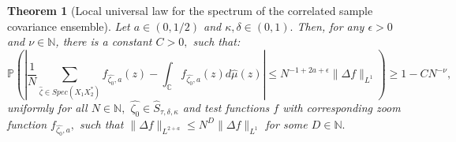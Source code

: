 \documentclass[10pt,a4paper]{amsart}
\newtheorem{thm}{Theorem}
\begin{document}
\begin{thm}[Local universal law for the spectrum of the correlated sample covariance ensemble] \label{main'}
%
Let $a\in (0,1/2)$ and $\kappa,\delta \in (0,1).$ Then, for any $\epsilon>0$ and $\nu \in \mathbb{N}$, there is a constant $C>0,$ such that:
%
\[
\mathbb{P} \left ( \left | \frac{1}{N}\sum \limits_{\widehat{\zeta} \in Spec({X_1X_2^*})}f_{\widehat{\zeta_0},a} (z) - \int_{\mathbb{C}} f_{\widehat{\zeta_0},a} (z) d{\widehat{\mu}}(z)  \right | \leq N^{-1+2a+\epsilon} \|\Delta f\|_{L^1} \right ) \geq 1 - CN^{-\nu},
\]
uniformly for all $N \in \mathbb{N},$ $\widehat{\zeta_0} \in \widehat{S}_{\tau,\delta, \kappa}$ and test functions $f$ with corresponding zoom function $f_{\widehat{\zeta_0},a},$ such that $\|\Delta f\|_{L^{2+a}} \leq N^D \| \Delta f \|_{L^1}$ for some $D\in \mathbb{N}.$
\end{thm}
\end{document}
